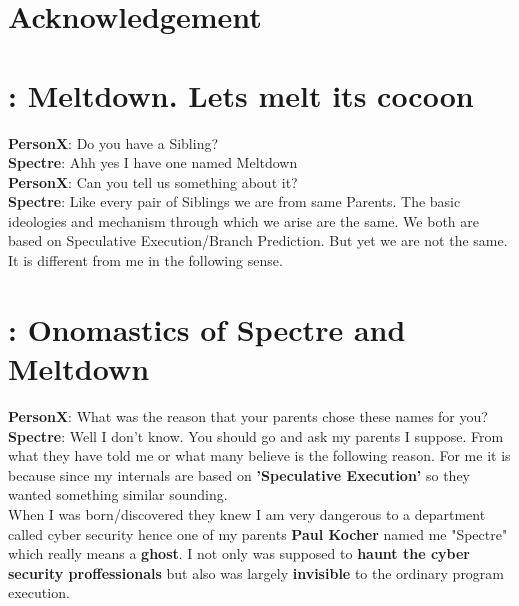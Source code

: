 \documentclass[12pt]{article}
\begin{document}
\section{Acknowledgement}
\newpage


\newpage
\begin{appendices}	
	\section{: Meltdown. Lets melt its cocoon}
	
	\textbf{PersonX}: Do you have a Sibling?\\
	
	\textbf{Spectre}: Ahh yes I have one named Meltdown\\
	
	\textbf{PersonX}: Can you tell us something about it?\\
	
	\textbf{Spectre}: Like every pair of Siblings we are from same Parents. The basic ideologies and mechanism through which we arise are the same. We both are based on Speculative Execution/Branch Prediction. But yet we are not the same. It is different from me in the following sense.
	
	\section{:  Onomastics of Spectre and Meltdown}
	
	\textbf{PersonX}: What was the reason that your parents chose these names for you?\\
	
	\textbf{Spectre}: Well I don't know. You should go and ask my parents I suppose. From what they have told me or what many believe is the following reason. For me it is because since my internals are based on \textbf{'Speculative Execution'}  so they wanted something similar sounding.\\ When I was born/discovered they knew I am very dangerous to a department called cyber security hence one of my parents \textbf{Paul Kocher} named me "Spectre" which really means a \textbf{ghost}. I not only was supposed to \textbf{haunt the cyber security proffessionals} but also was largely \textbf{invisible} to the ordinary program execution.\\
	

\end{appendices}
\end{document}
